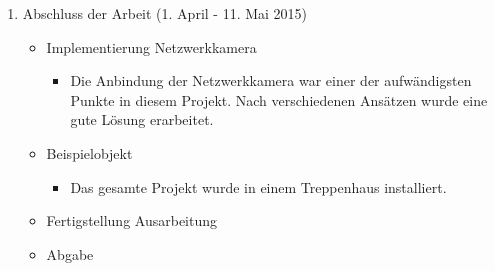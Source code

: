 \begin{enumerate}
\item Abschluss der Arbeit (1. April - 11. Mai 2015)
\begin{itemize}
\item Implementierung Netzwerkkamera
\begin{itemize}
\item Die Anbindung der Netzwerkkamera war einer der aufwändigsten Punkte in diesem Projekt. Nach verschiedenen Ansätzen wurde eine gute Lösung erarbeitet.
\end{itemize}
\item Beispielobjekt
\begin{itemize}
	\item Das gesamte Projekt wurde in einem Treppenhaus installiert.
\end{itemize}
\item Fertigstellung Ausarbeitung
\item  Abgabe
\end{itemize}

\end{enumerate}

